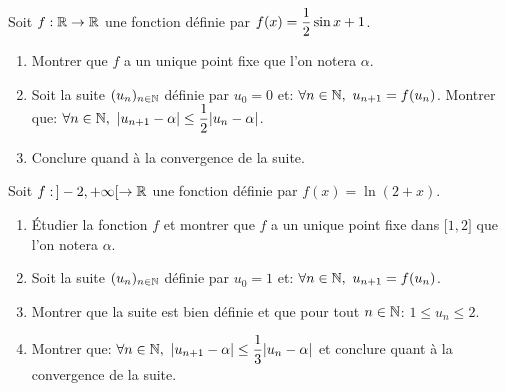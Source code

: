 \documentclass[a4paper, 11pt]{article}
\begin{document}
\begin{itemize}
	      \setlength\fboxrule{1pt}
	      \setlength\fboxrule{0.5pt}
	      \vsec

	      {\footnotesize
		      \begin{exercice}
			      Soit $f:\mathbb{R}\rightarrow \mathbb{R}$ une fonction d\'efinie par $f(x)=\displaystyle\frac{1}{2}\sin{x}+1$.
			      \begin{enumerate}
				      \item Montrer que $f$ a un unique point fixe que l'on notera $\alpha$.
				      \item Soit la suite $(u_n)_{n\in\mathbb{N}}$ d\'efinie par $u_0=0$ et: $\forall n\in\N,\ u_{n+1}=f(u_n)$. Montrer que: $\forall n\in\N,\ |u_{n+1}-\alpha|\leq \ddp\demi|u_n-\alpha|$.\\
				      \item Conclure quand \`a la convergence de la suite.
			      \end{enumerate}
		      \end{exercice}}
	      \vsec

	      {\footnotesize
		      \begin{exercice}
			      Soit $f: \, \rbrack -2,+\infty\lbrack \rightarrow \mathbb{R}$ une fonction d\'efinie par $f(x)=\ln{(2+x)}$.
			      \begin{enumerate}
				      \item \'Etudier la fonction $f$ et montrer que $f$ a un unique point fixe dans $\lbrack 1,2\rbrack$ que l'on notera $\alpha$.
				      \item Soit la suite $(u_n)_{n\in\mathbb{N}}$ d\'efinie par $u_0=1$ et: $\forall n\in\N,\ u_{n+1}=f(u_n)$.
				      \item Montrer que la suite est bien d\'efinie et que pour tout $n\in\mathbb{N}$: $1\leq u_n\leq 2$.
				      \item Montrer que: $\forall n\in\N,\ |u_{n+1}-\alpha|\leq \ddp\ddp\frac{1}{3} |u_n-\alpha|$ et conclure quant \`a la convergence de la suite.
			      \end{enumerate}
		      \end{exercice}}

\end{itemize}
\end{document}
